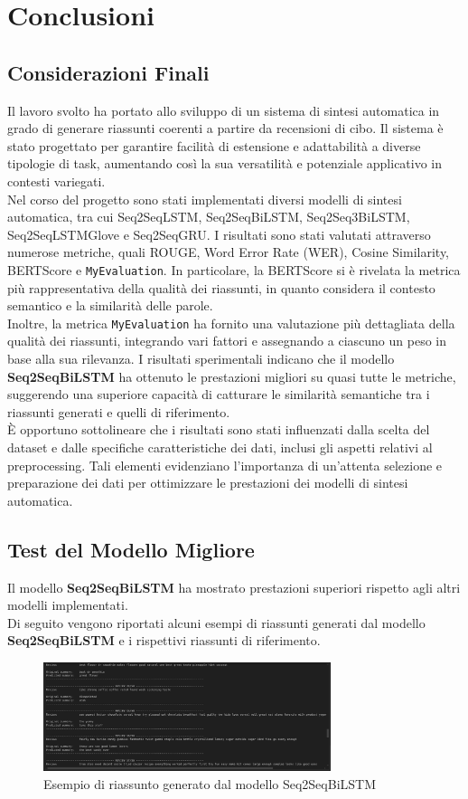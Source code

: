 \section{Conclusioni} 
\subsection{Considerazioni Finali}
Il lavoro svolto ha portato allo sviluppo di un sistema di sintesi automatica in grado di generare riassunti coerenti a partire da recensioni di cibo. Il sistema è stato progettato per garantire facilità di estensione e adattabilità a diverse tipologie di task, aumentando così la sua versatilità e potenziale applicativo in contesti variegati.\\
Nel corso del progetto sono stati implementati diversi modelli di sintesi automatica, tra cui Seq2SeqLSTM, Seq2SeqBiLSTM, Seq2Seq3BiLSTM, Seq2SeqLSTMGlove e Seq2SeqGRU.
I risultati sono stati valutati attraverso numerose metriche, quali ROUGE, Word Error Rate (WER), Cosine Similarity, BERTScore e \texttt{MyEvaluation}. In particolare,
la BERTScore si è rivelata la metrica più rappresentativa della qualità dei riassunti, in quanto considera il contesto semantico e la similarità delle parole.\\

Inoltre, la metrica \texttt{MyEvaluation} ha fornito una valutazione più dettagliata della qualità dei riassunti, integrando vari fattori e assegnando a ciascuno 
un peso in base alla sua rilevanza. I risultati sperimentali indicano che il modello \textbf{Seq2SeqBiLSTM} ha ottenuto le prestazioni migliori su quasi tutte le metriche, 
suggerendo una superiore capacità di catturare le similarità semantiche tra i riassunti generati e quelli di riferimento.\\

È opportuno sottolineare che i risultati sono stati influenzati dalla scelta del dataset e dalle specifiche caratteristiche dei dati, 
inclusi gli aspetti relativi al preprocessing. Tali elementi evidenziano l'importanza di un'attenta selezione e preparazione dei dati per 
ottimizzare le prestazioni dei modelli di sintesi automatica.

\subsection{Test del Modello Migliore}
Il modello \textbf{Seq2SeqBiLSTM} ha mostrato prestazioni superiori rispetto agli altri modelli implementati.\\
Di seguito vengono riportati alcuni esempi di riassunti generati dal modello \textbf{Seq2SeqBiLSTM} e i rispettivi riassunti di riferimento.\\

\begin{figure}[H]
    \centering
    \includegraphics[width=0.75\textwidth]{media/Seq2SeqBiLSTM_inference.png}
    \caption{Esempio di riassunto generato dal modello Seq2SeqBiLSTM}
    \label{fig:example1}
\end{figure}